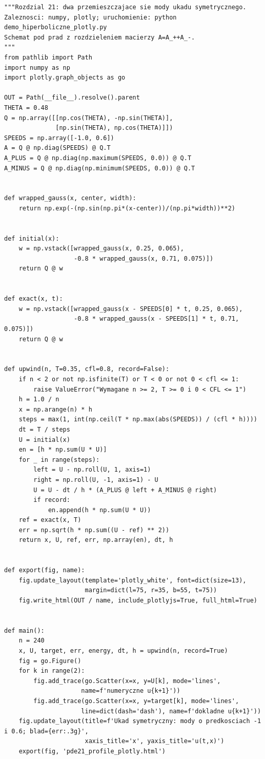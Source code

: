 \begin{lstlisting}[style=pythonpde,caption={Hiperboliczny układ, energia i zbieżność: Plotly},label={code:pde21-plotly}]
"""Rozdzial 21: dwa przemieszczajace sie mody ukadu symetrycznego.
Zaleznosci: numpy, plotly; uruchomienie: python demo_hiperboliczne_plotly.py
Schemat pod prad z rozdzieleniem macierzy A=A_++A_-.
"""
from pathlib import Path
import numpy as np
import plotly.graph_objects as go

OUT = Path(__file__).resolve().parent
THETA = 0.48
Q = np.array([[np.cos(THETA), -np.sin(THETA)],
              [np.sin(THETA), np.cos(THETA)]])
SPEEDS = np.array([-1.0, 0.6])
A = Q @ np.diag(SPEEDS) @ Q.T
A_PLUS = Q @ np.diag(np.maximum(SPEEDS, 0.0)) @ Q.T
A_MINUS = Q @ np.diag(np.minimum(SPEEDS, 0.0)) @ Q.T


def wrapped_gauss(x, center, width):
    return np.exp(-(np.sin(np.pi*(x-center))/(np.pi*width))**2)


def initial(x):
    w = np.vstack([wrapped_gauss(x, 0.25, 0.065),
                   -0.8 * wrapped_gauss(x, 0.71, 0.075)])
    return Q @ w


def exact(x, t):
    w = np.vstack([wrapped_gauss(x - SPEEDS[0] * t, 0.25, 0.065),
                   -0.8 * wrapped_gauss(x - SPEEDS[1] * t, 0.71, 0.075)])
    return Q @ w


def upwind(n, T=0.35, cfl=0.8, record=False):
    if n < 2 or not np.isfinite(T) or T < 0 or not 0 < cfl <= 1:
        raise ValueError("Wymagane n >= 2, T >= 0 i 0 < CFL <= 1")
    h = 1.0 / n
    x = np.arange(n) * h
    steps = max(1, int(np.ceil(T * np.max(abs(SPEEDS)) / (cfl * h))))
    dt = T / steps
    U = initial(x)
    en = [h * np.sum(U * U)]
    for _ in range(steps):
        left = U - np.roll(U, 1, axis=1)
        right = np.roll(U, -1, axis=1) - U
        U = U - dt / h * (A_PLUS @ left + A_MINUS @ right)
        if record:
            en.append(h * np.sum(U * U))
    ref = exact(x, T)
    err = np.sqrt(h * np.sum((U - ref) ** 2))
    return x, U, ref, err, np.array(en), dt, h


def export(fig, name):
    fig.update_layout(template='plotly_white', font=dict(size=13),
                      margin=dict(l=75, r=35, b=55, t=75))
    fig.write_html(OUT / name, include_plotlyjs=True, full_html=True)


def main():
    n = 240
    x, U, target, err, energy, dt, h = upwind(n, record=True)
    fig = go.Figure()
    for k in range(2):
        fig.add_trace(go.Scatter(x=x, y=U[k], mode='lines',
                     name=f'numeryczne u{k+1}'))
        fig.add_trace(go.Scatter(x=x, y=target[k], mode='lines',
                     line=dict(dash='dash'), name=f'dokladne u{k+1}'))
    fig.update_layout(title=f'Ukad symetryczny: mody o predkosciach -1 i 0.6; blad={err:.3g}',
                      xaxis_title='x', yaxis_title='u(t,x)')
    export(fig, 'pde21_profile_plotly.html')


\end{lstlisting}
